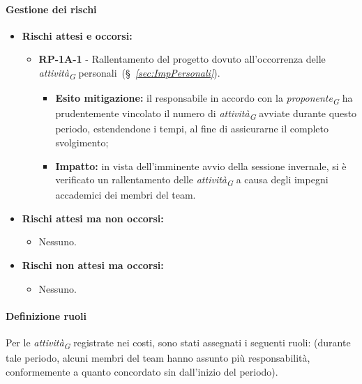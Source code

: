 \paragraph{Gestione dei rischi} 
\begin{itemize}
    \item \textbf{Rischi attesi e occorsi:}
\begin{itemize}
    \item \textbf{RP-1A-1} - Rallentamento del progetto dovuto all'occorrenza delle \textit{attività}\textsubscript{\textit{G}} personali~(\S~\textit{\ref{sec:ImpPersonali}}).
    \begin{itemize}
        \item \textbf{Esito mitigazione:}
            il responsabile in accordo con la \textit{proponente}\textsubscript{\textit{G}} ha prudentemente vincolato il numero di \textit{attività}\textsubscript{\textit{G}} avviate durante questo periodo, estendendone i tempi, al fine di assicurarne il completo svolgimento;
        \item \textbf{Impatto:}
            in vista dell'imminente avvio della sessione invernale, si è verificato un rallentamento delle \textit{attività}\textsubscript{\textit{G}} a causa degli impegni accademici dei membri del team.
    \end{itemize}
\end{itemize}
\item \textbf{Rischi attesi ma non occorsi:}
 \begin{itemize}
    \item Nessuno.
\end{itemize}
\item \textbf{Rischi non attesi ma occorsi:}
\begin{itemize}
    \item Nessuno.
\end{itemize}
\end{itemize}

\paragraph{Definizione ruoli} 
Per le \textit{attività}\textsubscript{\textit{G}} registrate nei costi, sono stati assegnati i seguenti ruoli: (durante tale periodo, alcuni membri del team hanno assunto più responsabilità, conformemente a quanto concordato sin dall'inizio del periodo).

\vspace{0.4cm}


